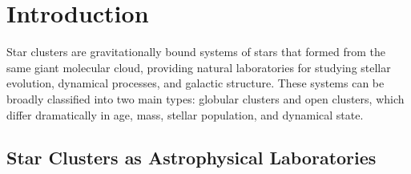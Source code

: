 \documentclass[linenumbers,trackchanges,twocolumn]{aastex701}
\begin{document}


\section{Introduction} \label{sec:intro}

Star clusters are gravitationally bound systems of stars that formed from the same giant molecular cloud, providing natural laboratories for studying stellar evolution, dynamical processes, and galactic structure. These systems can be broadly classified into two main types: globular clusters and open clusters, which differ dramatically in age, mass, stellar population, and dynamical state.

\subsection{Star Clusters as Astrophysical Laboratories}
\end{document}
